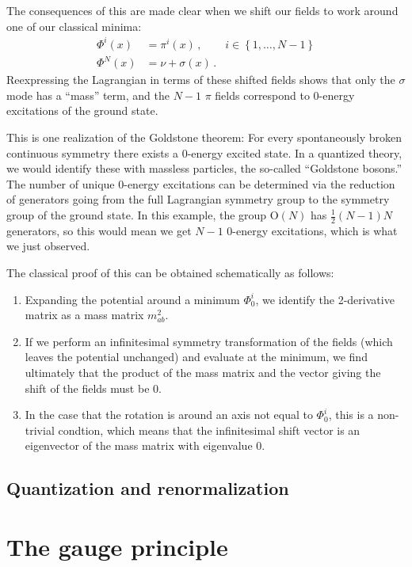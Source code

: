 \documentclass[12pt]{memoir}
\begin{document}
The consequences of this are made clear when we shift our fields to work around one of our classical minima:
\begin{align}
  \Phi^i(x) & = \pi^i(x)\,,  &i \in \left\{1,\ldots,N-1\right\}\\
  \Phi^N(x) &=  \nu + \sigma(x)\,. &
\end{align}
Reexpressing the Lagrangian in terms of these shifted fields shows that only the $\sigma$ mode has a ``mass'' term,
and the $N-1$ $\pi$ fields correspond to 0-energy excitations of the ground state.

This is one realization of the Goldstone theorem:
For every spontaneously broken continuous symmetry there exists a 0-energy excited state.
In a quantized theory, we would identify these with massless particles, the so-called ``Goldstone bosons.''
The number of unique 0-energy excitations can be determined via the reduction of generators
going from the full Lagrangian symmetry group to the symmetry group of the ground state.
In this example, the group $\text{O}(N)$ has $\frac{1}{2}(N-1)N$ generators,
so this would mean we get $N-1$ 0-energy excitations, which is what we just observed.

The classical proof of this can be obtained schematically as follows:
\begin{enumerate}
  \item Expanding the potential around a minimum $\Phi_0^i$, we identify the 2-derivative matrix as a mass matrix $m^2_{ab}$.
  \item If we perform an infinitesimal symmetry transformation of the fields
    (which leaves the potential unchanged)
    and evaluate at the minimum,
    we find ultimately that the product of the mass matrix and the vector giving the shift of the fields must be 0.
  \item In the case that the rotation is around an axis not equal to $\Phi_0^i$, this is a non-trivial condtion,
    which means that the infinitesimal shift vector is an eigenvector of the mass matrix with eigenvalue 0.
\end{enumerate}



\section{Quantization and renormalization}

\chapter{The gauge principle}
\end{document}
